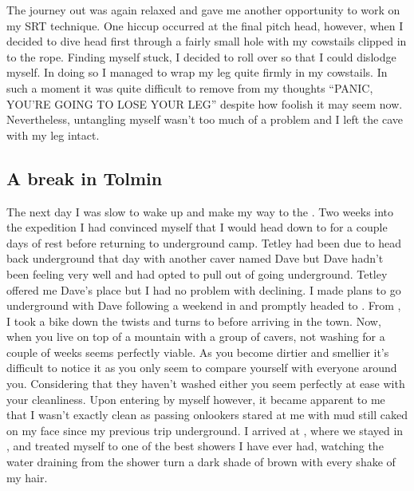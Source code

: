
The journey out was again relaxed and gave me another opportunity to
work on my SRT technique. One hiccup occurred at the final pitch head,
however, when I decided to dive head first through a fairly small hole
with my cowstails clipped in to the rope. Finding myself stuck, I
decided to roll over so that I could dislodge myself. In doing so I
managed to wrap my leg quite firmly in my cowstails. In such a moment it
was quite difficult to remove from my thoughts ``PANIC, YOU'RE GOING TO
LOSE YOUR LEG'' despite how foolish it may seem now. Nevertheless,
untangling myself wasn't too much of a problem and I left the cave with
my leg intact.

\subsection{A break in Tolmin}

The next day I was slow to wake up and make my way to the . Two
weeks into the expedition I had convinced myself that I would head down
to  for a couple days of rest before returning to underground
camp. Tetley had been due to head back underground that day with another
caver named Dave but Dave hadn't been feeling very well and had opted to
pull out of going underground. Tetley offered me Dave's place but I had
no problem with declining. I made plans to go underground with Dave
following a weekend in  and promptly headed to . From ,
I took a bike down the twists and turns to  before arriving in the
town. Now, when you live on top of a mountain with a group of cavers,
not washing for a couple of weeks seems perfectly viable. As you become
dirtier and smellier it's difficult to notice it as you only seem to
compare yourself with everyone around you. Considering that they haven't
washed either you seem perfectly at ease with your cleanliness. Upon
entering  by myself however, it became apparent to me that I
wasn't exactly clean as passing onlookers stared at me with mud still
caked on my face since my previous trip underground. I arrived at
, where we stayed in , and treated myself to one of
the best showers I have ever had, watching the water draining from the
shower turn a dark shade of brown with every shake of my hair.

